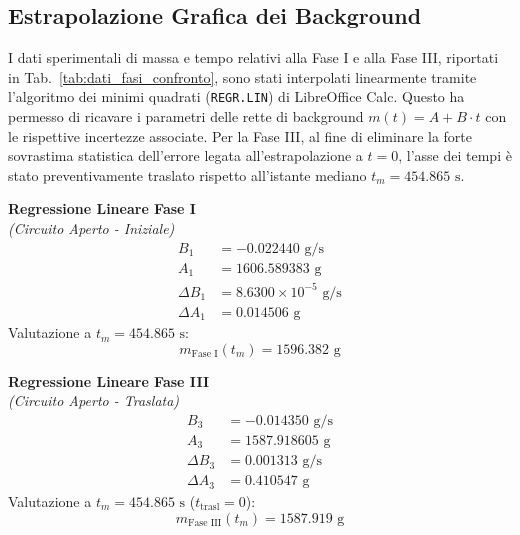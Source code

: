 \documentclass[a4paper,12pt]{article}
\begin{document}
\subsection{Estrapolazione Grafica dei Background}
I dati sperimentali di massa e tempo relativi alla Fase I e alla Fase III, riportati in Tab.~\ref{tab:dati_fasi_confronto}, sono stati interpolati linearmente tramite l'algoritmo dei minimi quadrati (\texttt{REGR.LIN}) di LibreOffice Calc. Questo ha permesso di ricavare i parametri delle rette di background $m(t) = A + B \cdot t$ con le rispettive incertezze associate. Per la Fase III, al fine di eliminare la forte sovrastima statistica dell'errore legata all'estrapolazione a $t=0$, l'asse dei tempi è stato preventivamente traslato rispetto all'istante mediano $t_m = 454.865\text{ s}$.
\noindent
\begin{minipage}[t]{0.48\textwidth}
    \centering
    \textbf{Regressione Lineare Fase I} \\
    \textit{(Circuito Aperto - Iniziale)}
    \begin{align*}
        B_1 &= -0.022440 \text{ g/s} \\
        A_1 &= 1606.589383 \text{ g} \\
        \Delta B_1 &= 8.6300 \times 10^{-5} \text{ g/s} \\
        \Delta A_1 &= 0.014506 \text{ g}
    \end{align*}
    Valutazione a $t_m = 454.865\text{ s}$:
    \begin{equation*}
        m_{\text{Fase I}}(t_m) = 1596.382\text{ g}
    \end{equation*}
\end{minipage}
\hfill
\begin{minipage}[t]{0.48\textwidth}
    \centering
    \textbf{Regressione Lineare Fase III} \\
    \textit{(Circuito Aperto - Traslata)}
    \begin{align*}
        B_3 &= -0.014350 \text{ g/s} \\
        A_3 &= 1587.918605 \text{ g} \\
        \Delta B_3 &= 0.001313 \text{ g/s} \\
        \Delta A_3 &= 0.410547 \text{ g}
    \end{align*}
    Valutazione a $t_m = 454.865\text{ s}$ ($t_{\text{trasl}} = 0$):
    \begin{equation*}
        m_{\text{Fase III}}(t_m) = 1587.919\text{ g}
    \end{equation*}
\end{minipage}
\end{document}
